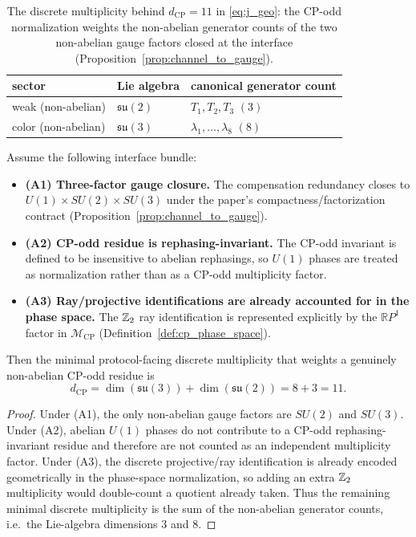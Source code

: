 \begin{table}[t]
\centering
\small
\setlength{\tabcolsep}{10pt}
\renewcommand{\arraystretch}{1.15}
\begin{tabular}{lll}
\toprule
sector & Lie algebra & canonical generator count \\
\midrule
weak (non-abelian)  & $\mathfrak{su}(2)$ & $T_1,T_2,T_3$ \quad $(3)$ \\
color (non-abelian) & $\mathfrak{su}(3)$ & $\lambda_1,\dots,\lambda_8$ \quad $(8)$ \\
\bottomrule
\end{tabular}
\caption{The discrete multiplicity behind $d_{\mathrm{CP}}=11$ in \eqref{eq:j_geo}: the CP-odd normalization weights the non-abelian generator counts of the two non-abelian gauge factors closed at the interface (Proposition~\ref{prop:channel_to_gauge}).}
\label{tab:dcp_generator_count}
\end{table}

\begin{proposition}\label{prop:dcp_forced_11}
Assume the following interface bundle:
\begin{itemize}
\item \textbf{(A1) Three-factor gauge closure.} The compensation redundancy closes to $U(1)\times SU(2)\times SU(3)$ under the paper's compactness/factorization contract (Proposition~\ref{prop:channel_to_gauge}).
\item \textbf{(A2) CP-odd residue is rephasing-invariant.} The CP-odd invariant is defined to be insensitive to abelian rephasings, so $U(1)$ phases are treated as normalization rather than as a CP-odd multiplicity factor.
\item \textbf{(A3) Ray/projective identifications are already accounted for in the phase space.} The $\mathbb{Z}_2$ ray identification is represented explicitly by the $\mathbb{R}P^1$ factor in $\mathcal{M}_{\mathrm{CP}}$ (Definition~\ref{def:cp_phase_space}).
\end{itemize}
Then the minimal protocol-facing discrete multiplicity that weights a genuinely non-abelian CP-odd residue is
\[
d_{\mathrm{CP}}=\dim(\mathfrak{su}(3))+\dim(\mathfrak{su}(2))=8+3=11.
\]
\end{proposition}
\begin{proof}
Under (A1), the only non-abelian gauge factors are $SU(2)$ and $SU(3)$.
Under (A2), abelian $U(1)$ phases do not contribute to a CP-odd rephasing-invariant residue and therefore are not counted as an independent multiplicity factor.
Under (A3), the discrete projective/ray identification is already encoded geometrically in the phase-space normalization, so adding an extra $\mathbb{Z}_2$ multiplicity would double-count a quotient already taken.
Thus the remaining minimal discrete multiplicity is the sum of the non-abelian generator counts, i.e.\ the Lie-algebra dimensions $3$ and $8$.
\end{proof}

